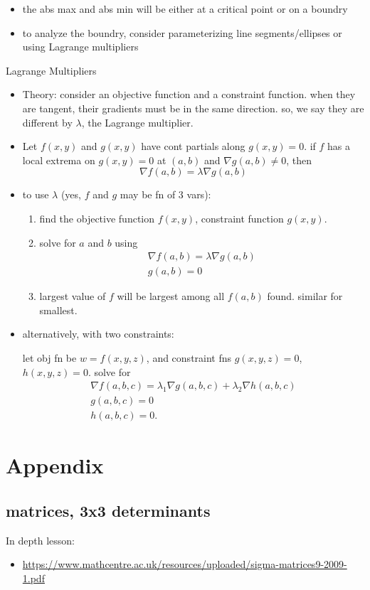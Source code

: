 \documentclass[11pt]{article}
\theoremstyle{definition}
\newcommand{\addsection}[1]{\section*{#1}\addcontentsline{toc}{section}{#1}} %
\newcommand{\col}[1]{\begin{minipage}{\columnwidth}#1\end{minipage}}
\begin{document}
\begin{multicols}{2}
{\begin{itemize}
      a cont function on a closed and bounded set has an abs min and abs max in the set
      \item the abs max and abs min will be either at a critical point or on a boundry
      \item to analyze the boundry, consider parameterizing line segments/ellipses or using Lagrange multipliers
    \end{itemize}
  }
  \col{
    Lagrange Multipliers
    \begin{itemize}
      \item Theory: consider an objective function and a constraint function. when they are tangent, their gradients must be in the same direction. so, we say they are different by $\lambda$, the Lagrange multiplier.
      \item Let $f(x,y)$ and $g(x,y)$ have cont partials along $g(x,y)=0$. if $f$ has a local extrema on $g(x,y)=0$ at $(a,b)$ and $\nabla g(a,b) \ne 0$, then
      \[ \nabla f(a,b) = \lambda \nabla g(a,b) \]
      \item to use $\lambda$ (yes, $f$ and $g$ may be fn of 3 vars):
      \begin{enumerate}
        \item find the objective function $f(x,y)$, constraint function $g(x,y)$.
        \item solve for $a$ and $b$ using
        \begin{gather*}
          \nabla f(a,b) = \lambda\nabla g(a,b) \\
          g(a,b)=0
        \end{gather*}
        \item largest value of $f$ will be largest among all $f(a,b)$ found. similar for smallest.
      \end{enumerate}
      \item alternatively, with two constraints:
      
      let obj fn be $w=f(x,y,z)$, and constraint fns $g(x,y,z)=0$, $h(x,y,z)=0$. solve for
      \begin{gather*}
        \nabla f(a,b,c) = \lambda_1\nabla g(a,b,c) + \lambda_2\nabla h(a,b,c) \\
        g(a,b,c) = 0 \\
        h(a,b,c) = 0.
      \end{gather*}
    \end{itemize}
  }
\end{multicols}

\newpage
\addsection{Appendix} 
\subsection*{matrices, 3x3 determinants}
In depth lesson:
\begin{itemize}
  \item \url{https://www.mathcentre.ac.uk/resources/uploaded/sigma-matrices9-2009-1.pdf}
\end{itemize}
\end{document}
